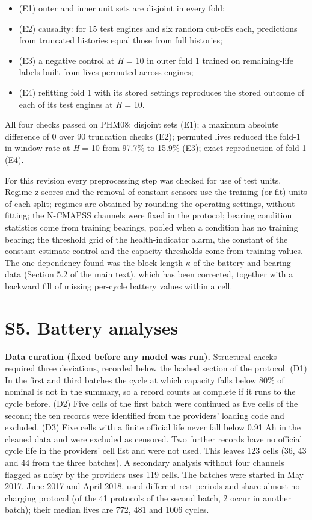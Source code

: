 \documentclass[11pt,a4paper]{article}
\begin{document}
\begin{itemize}[leftmargin=1.2em,itemsep=2pt]
\item (E1) outer and inner unit sets are disjoint in every fold;
\item (E2) causality: for 15 test engines and six random cut-offs each, predictions from truncated histories equal those from full histories;
\item (E3) a negative control at \textit{H} = 10 in outer fold 1 trained on remaining-life labels built from lives permuted across engines;
\item (E4) refitting fold 1 with its stored settings reproduces the stored outcome of each of its test engines at \textit{H} = 10.
\end{itemize}

\noindent All four checks passed on PHM08: disjoint sets (E1); a maximum absolute difference of 0 over 90 truncation checks (E2); permuted lives reduced the fold-1 in-window rate at \textit{H} = 10 from 97.7\% to 15.9\% (E3); exact reproduction of fold 1 (E4).

\noindent For this revision every preprocessing step was checked for use of test units. Regime z-scores and the removal of constant sensors use the training (or fit) units of each split; regimes are obtained by rounding the operating settings, without fitting; the N-CMAPSS channels were fixed in the protocol; bearing condition statistics come from training bearings, pooled when a condition has no training bearing; the threshold grid of the health-indicator alarm, the constant of the constant-estimate control and the capacity thresholds come from training values. The one dependency found was the block length $\kappa$ of the battery and bearing data (Section 5.2 of the main text), which has been corrected, together with a backward fill of missing per-cycle battery values within a cell.

\section*{S5. Battery analyses}

\noindent \textbf{Data curation (fixed before any model was run).} Structural checks required three deviations, recorded below the hashed section of the protocol. (D1) In the first and third batches the cycle at which capacity falls below 80\% of nominal is not in the summary, so a record counts as complete if it runs to the cycle before. (D2) Five cells of the first batch were continued as five cells of the second; the ten records were identified from the providers' loading code and excluded. (D3) Five cells with a finite official life never fall below 0.91 Ah in the cleaned data and were excluded as censored. Two further records have no official cycle life in the providers' cell list and were not used. This leaves 123 cells (36, 43 and 44 from the three batches). A secondary analysis without four channels flagged as noisy by the providers uses 119 cells. The batches were started in May 2017, June 2017 and April 2018, used different rest periods and share almost no charging protocol (of the 41 protocols of the second batch, 2 occur in another batch); their median lives are 772, 481 and 1006 cycles.
\end{document}
